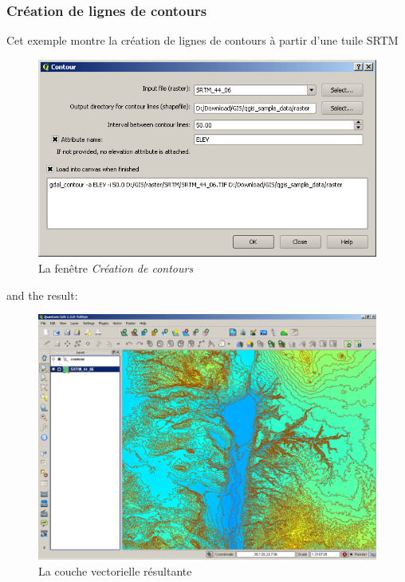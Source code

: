 {\subsubsection{Création de lignes de contours}
Cet exemple montre la création de lignes de contours à partir d'une tuile SRTM
\begin{figure}[ht]
   \centering
   \caption{La fenêtre \emph{Création de contours} \nixcaption}\label{gdal_contour}
   \includegraphics[clip=true, width=12cm]{plugins_gdaltools_images/gdal_contour}
\end{figure}
and the result:
\begin{figure}[ht]
   \centering
   \caption{La couche vectorielle résultante \nixcaption}\label{gdal_contour}
   \includegraphics[clip=true, width=12cm]{plugins_gdaltools_images/qgis_contours}
\end{figure}

}
